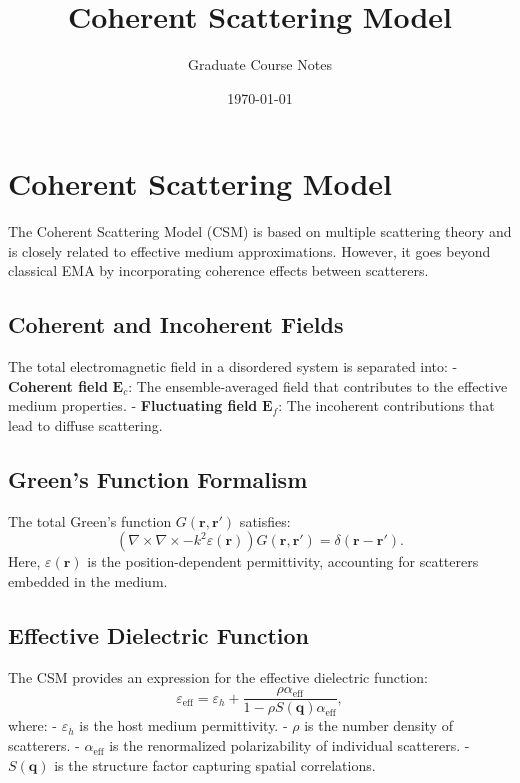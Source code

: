 \documentclass{article}
\begin{document}
	
	\title{Coherent Scattering Model}
	\author{Graduate Course Notes}
	\date{\today}
	\maketitle
			
	\section{Coherent Scattering Model}
	The Coherent Scattering Model (CSM) is based on multiple scattering theory and is closely related to effective medium approximations. However, it goes beyond classical EMA by incorporating coherence effects between scatterers.
	
	\subsection{Coherent and Incoherent Fields}
	The total electromagnetic field in a disordered system is separated into:
	- \textbf{Coherent field} $\mathbf{E}_c$: The ensemble-averaged field that contributes to the effective medium properties.
	- \textbf{Fluctuating field} $\mathbf{E}_f$: The incoherent contributions that lead to diffuse scattering.
	
	\subsection{Green’s Function Formalism}
	The total Green’s function $G(\mathbf{r}, \mathbf{r'})$ satisfies:
	\begin{equation}
		\left( \nabla \times \nabla \times - k^2 \varepsilon(\mathbf{r}) \right) G(\mathbf{r}, \mathbf{r'}) = \delta(\mathbf{r} - \mathbf{r'}).
	\end{equation}
	Here, $\varepsilon(\mathbf{r})$ is the position-dependent permittivity, accounting for scatterers embedded in the medium.
	
	\subsection{Effective Dielectric Function}
	The CSM provides an expression for the effective dielectric function:
	\begin{equation}
		\varepsilon_{\text{eff}} = \varepsilon_h + \frac{\rho \alpha_{\text{eff}}}{1 - \rho S(\mathbf{q}) \alpha_{\text{eff}}},
	\end{equation}
	where:
	- $\varepsilon_h$ is the host medium permittivity.
	- $\rho$ is the number density of scatterers.
	- $\alpha_{\text{eff}}$ is the renormalized polarizability of individual scatterers.
	- $S(\mathbf{q})$ is the structure factor capturing spatial correlations.
	
\end{document}
